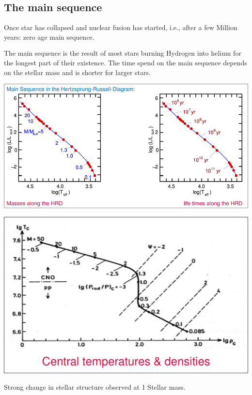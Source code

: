 \documentclass[11pt,a4paper]{article}
\begin{document}
\subsection{The main sequence}
Once star has collapsed and nuclear fusion has started, i.e., after a few Million years: zero age main sequence.

The main sequence is the result of most stars burning Hydrogen into helium for the longest part of their existence.
The time spend on the main sequence depends on the stellar mass and is shorter for larger stars.
\begin{center}
    \includegraphics[width=0.5\linewidth]{screenshot_2024-01-23-115246.png}
\end{center}
\begin{center}
    \includegraphics[width=0.5\linewidth]{screenshot_2024-01-23-115334.png}
\end{center}
Strong change in stellar structure observed at 1 Stellar mass. 
\end{document}
